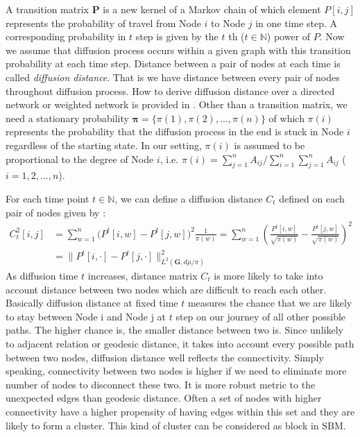 \documentclass[12pt]{article}
\theoremstyle{definition}
\begin{document}
A transition matrix $\mathbf{P}$ is a new kernel of a Markov chain of which element $P[i,j]$ represents the probability of travel from Node $i$ to Node $j$ in one time step. A corresponding probability in $t$ step is given by the $t$ th ($t \in \mathbb{N}$) power of $P$. Now we assume that diffusion process occurs within a given graph with this transition probability at each time step. Distance between a pair of nodes at each time is called \textit{diffusion distance}. That is we have distance between every pair of nodes throughout diffusion process. How to derive diffusion distance over a directed network or weighted network is provided in \cite{tang2010graph}. Other than a transition matrix, we need a stationary probability $\boldsymbol{\pi} = \{\pi(1), \pi(2), ... , \pi(n) \}$ of which $\pi(i)$ represents the probability that the diffusion process in the end is stuck in Node $i$ regardless of the starting state. In our setting, $\pi(i)$ is assumed to be proportional to the degree of Node $i$, i.e. $\pi(i) = \sum\limits_{j=1}^{n} A_{ij} \big/ \sum\limits_{i=1}^{n}\sum\limits_{j=1}^{n} A_{ij}$ ($i=1,2,..., n$).   
	
For each time point $t \in \mathbb{N}$, we can define a diffusion distance $C_{t}$ defined on each pair of nodes given by :	
\begin{equation}
\label{eq:diffusion}
\begin{split}
C^2_{t}[i,j] & = \sum\limits_{w =1}^{n} \big( P^{t}[i,w] - P^{t}[j,w]  \big)^{2} \frac{1}{\pi(w)} = \sum\limits_{w=1}^{n} \left(  \frac{P^{t}[i,w]}{\sqrt{\pi(w)}} - \frac{P^{t}[j,w]}{\sqrt{\pi(w)}}   \right)^2 \\ & = \parallel P^{t}[i, \cdot] - P^{t}[j, \cdot]  \parallel^2_{L^{2}(\boldsymbol{G}, d\mu / \pi)  }
\end{split}
\end{equation}
As diffusion time $t$ increases, distance matrix $C_{t}$ is more likely to take into account distance between two nodes which are difficult to reach each other. Basically diffusion distance at fixed time $t$ measures the chance that we are likely to stay between Node i and Node j at $t$ step on our journey of all other possible paths. The higher chance is, the smaller distance between two is. Since unlikely to adjacent relation or geodesic distance, it takes into account every possible path between two nodes, diffusion distance well reflects the connectivity. Simply speaking, connectivity between two nodes is higher if we need to eliminate more number of nodes to disconnect these two. It is more robust metric to the unexpected edges than geodesic distance. Often a set of nodes with higher connectivity have a higher propensity of having edges within this set and they are likely to form a cluster. This kind of cluster can be considered as block in SBM. 
	
\end{document}

